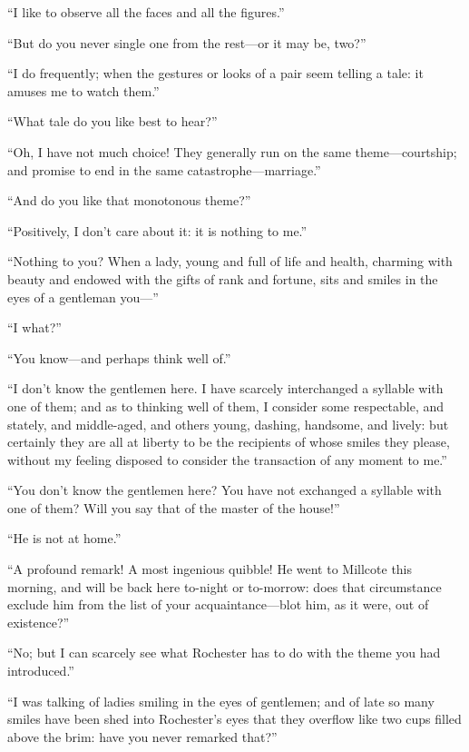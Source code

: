 \enquote{I like to observe all the faces and all the figures.}

\enquote{But do you never single one from the rest---or it may be, two?}

\enquote{I do frequently; when the gestures or looks of a pair seem
	telling a tale: it amuses me to watch them.}

\enquote{What tale do you like best to hear?}

\enquote{Oh, I have not much choice! They generally run on the same
	theme---courtship; and promise to end in the same
	catastrophe---marriage.}

\enquote{And do you like that monotonous theme?}

\enquote{Positively, I don't care about it: it is nothing to me.}

\enquote{Nothing to you? When a lady, young and full of life and
	health, charming with beauty and endowed with the gifts of rank and
	fortune, sits and smiles in the eyes of a gentleman you---}

\enquote{I what?}

\enquote{You know---and perhaps think well of.}

\enquote{I don't know the gentlemen here. I have scarcely interchanged
	a syllable with one of them; and as to thinking well of them, I consider
	some respectable, and stately, and middle-aged, and others young,
	dashing, handsome, and lively: but certainly they are all at liberty to
	be the recipients of whose smiles they please, without my feeling
	disposed to consider the transaction of any moment to me.}

\enquote{You don't know the gentlemen here? You have not exchanged a
	syllable with one of them? Will you say that of the master of the
	house!}

\enquote{He is not at home.}

\enquote{A profound remark! A most ingenious quibble! He went to
	Millcote this morning, and will be back here to-night or to-morrow: does
	that circumstance exclude him from the list of your acquaintance---blot
	him, as it were, out of existence?}

\enquote{No; but I can scarcely see what \Mr{} Rochester has to do with
	the theme you had introduced.}

\enquote{I was talking of ladies smiling in the eyes of gentlemen; and
	of late so many smiles have been shed into \Mr{} Rochester's eyes that
	they overflow like two cups filled above the brim: have you never
	remarked that?}

